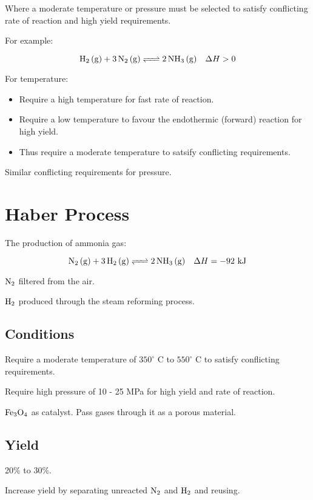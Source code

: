 \documentclass[a4paper,11pt]{article}
\begin{document}
Where a moderate temperature or pressure must be selected to satisfy conflicting
rate of reaction and high yield requirements.

For example:

$$
\ce{H2 (g) + 3N2 (g) <=> 2NH3 (g)} \quad \Delta H > 0
$$

For temperature:

\begin{itemize}
\item Require a high temperature for fast rate of reaction.
\item Require a low temperature to favour the endothermic (forward) reaction for
	high yield.
\item Thus require a moderate temperature to satsify conflicting requirements.
\end{itemize}

Similar conflicting requirements for pressure.




\section{Haber Process}

The production of ammonia gas:

$$
\ce{N2 (g) + 3H2 (g) <=> 2NH3 (g)} \quad \Delta H = -92\text{ kJ}
$$

$\ce{N2}$ filtered from the air.

$\ce{H2}$ produced through the steam reforming process.


\subsection{Conditions}

Require a moderate temperature of $350^\circ\text{ C}$ to $550^\circ\text{ C}$
to satisfy conflicting requirements.

Require high pressure of 10 - 25 MPa for high yield and rate of reaction.

$\ce{Fe3O4}$ as catalyst. Pass gases through it as a porous material.


\subsection{Yield}

20\% to 30\%.

Increase yield by separating unreacted $\ce{N2}$ and $\ce{H2}$ and reusing.
\end{document}
